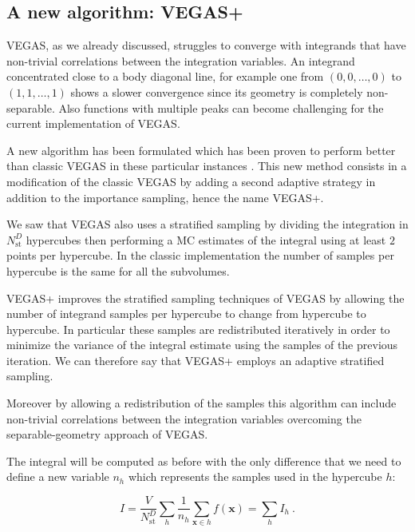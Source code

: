 \documentclass[../main/main.tex]{subfiles}
\begin{document}
\subsection{A new algorithm: VEGAS+}
\label{vegas+}
VEGAS, as we already discussed, struggles to converge with integrands that have non-trivial correlations between the integration variables. An integrand concentrated close to a body diagonal line, for example one from 
$(0,0,\dots,0)$ to $(1,1,\dots,1)$ shows a slower convergence since its geometry is completely non-separable. 
Also functions with multiple peaks can become challenging for the current implementation of VEGAS.

A new algorithm has been formulated which has been proven to perform better than classic VEGAS in these particular instances \cite{Lepage:2020tgj}.
This new method consists in a modification of the classic VEGAS by adding a second adaptive strategy in addition to the importance sampling, hence the name VEGAS+.

We saw that VEGAS also uses a stratified sampling by dividing the integration in $N_\text{st}^D$ hypercubes then performing a MC estimates of 
the integral using at least $2$ points per hypercube. In the classic implementation the number of samples per hypercube is the same for all the 
subvolumes.

VEGAS+ improves the stratified sampling techniques of VEGAS by allowing the number of integrand samples per hypercube to change from hypercube to hypercube. In particular these samples are redistributed iteratively in order to minimize the variance of the integral estimate using the 
samples of the previous iteration. We can therefore say that VEGAS+ employs an adaptive stratified sampling.

Moreover by allowing a redistribution of the samples this algorithm can include non-trivial correlations between the integration variables overcoming the separable-geometry approach of VEGAS.


The integral will be computed as before with the only difference that we need to define a new variable $n_h$ which represents the samples used 
in the hypercube $h$:

\begin{equation}
	I = \frac{V}{N_\text{st}^D}\sum_h \frac{1}{n_h} \sum_{\textbf{x} \in h} f(\textbf{x})  = \sum_h I_h \ .
\end{equation}
\end{document}
